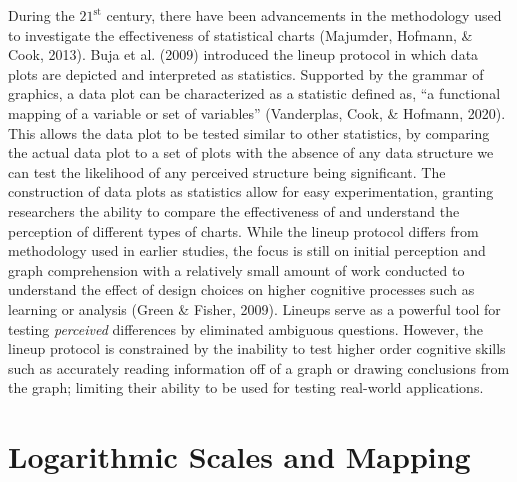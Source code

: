 \documentclass[print]{nuthesis}
\begin{document}
During the \(\text{21}^{\text{st}}\) century, there have been advancements in the methodology used to investigate the effectiveness of statistical charts (Majumder, Hofmann, \& Cook, 2013).
Buja et al. (2009) introduced the lineup protocol in which data plots are depicted and interpreted as statistics.
Supported by the grammar of graphics, a data plot can be characterized as a statistic defined as, ``a functional mapping of a variable or set of variables'' (Vanderplas, Cook, \& Hofmann, 2020).
This allows the data plot to be tested similar to other statistics, by comparing the actual data plot to a set of plots with the absence of any data structure we can test the likelihood of any perceived structure being significant.
The construction of data plots as statistics allow for easy experimentation, granting researchers the ability to compare the effectiveness of and understand the perception of different types of charts.
While the lineup protocol differs from methodology used in earlier studies, the focus is still on initial perception and graph comprehension with a relatively small amount of work conducted to understand the effect of design choices on higher cognitive processes such as learning or analysis (Green \& Fisher, 2009).
Lineups serve as a powerful tool for testing \emph{perceived} differences by eliminated ambiguous questions.
However, the lineup protocol is constrained by the inability to test higher order cognitive skills such as accurately reading information off of a graph or drawing conclusions from the graph; limiting their ability to be used for testing real-world applications.

\hypertarget{logarithmic-scales-and-mapping}{%
\section{Logarithmic Scales and Mapping}\label{logarithmic-scales-and-mapping}}
\end{document}
